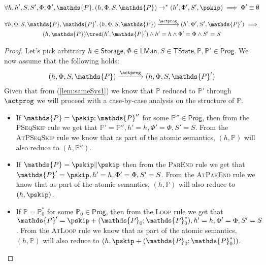 \lem \label{ref:phiemp}
\[
\forall h, h', S, S', \Phi, \Phi', \mathds{P} \ldotp
(h, \Phi, S, \mathds{P}) \rightarrow^* (h', \Phi', S', \pskip) \implies \Phi' \equiv \emptyset
\]

\lem \label{lem:sameSys}
\begin{gather*}
	\forall h, \Phi, S, \mathds{P}, \mathds{P}' \ldotp
	(h, \Phi, S, \mathds{P}) \xrightarrow{\actprog} (h', \Phi', S', \mathds{P}')
		\implies \\
	(h, \mathds{P}) \tred (h', \mathds{P}') \land h' = h \land \Phi' = \Phi \land S' = S
\end{gather*}
\begin{proof}
Let's pick arbitrary $h \in \mathsf{Storage}, \Phi \in \mathsf{LMan}, S \in \mathsf{TState}, \mathds{P}, \mathds{P}' \in \mathsf{Prog}$. We now assume that the following holds:
\begin{gather}
	\label{lem:sameSys1} (h, \Phi, S, \mathds{P}) \xrightarrow{\actprog} (h, \Phi, S, \mathds{P}')
\end{gather}
Given that from (\ref{lem:sameSys1}) we know that $\mathds{P}$ reduced to $\mathds{P'}$ through $\actprog$ we will proceed with a case-by-case analysis on the structure of $\mathds{P}$.
\begin{itemize}
	\item If $\mathds{P} = \pskip ; \mathds{P}''$ for some $\mathds{P}'' \in \mathsf{Prog}$, then from the \textsc{PSeqSkip} rule we get that $\mathds{P}' = \mathds{P}'', h' = h, \Phi' = \Phi, S' = S$. From the \textsc{AtPSeqSkip} rule we know that as part of the atomic semantics, $(h, \mathds{P})$ will also reduce to $(h, \mathds{P}'')$.
	
	\item If $\mathds{P} = \pskip \| \pskip$ then from the \textsc{ParEnd} rule we get that $\mathds{P}' = \pskip, h' = h, \Phi' = \Phi, S' = S$. From the \textsc{AtParEnd} rule we know that as part of the atomic semantics, $(h, \mathds{P})$ will also reduce to $(h, \pskip)$.
	
	\item If $\mathds{P} = \mathds{P}_0^*$ for some $\mathds{P}_0 \in \mathsf{Prog}$, then from the \textsc{Loop} rule we get that $\mathds{P}' = \pskip + (\mathds{P}_0;\mathds{P}_0^*), h' = h, \Phi' = \Phi, S' = S$. From the \textsc{AtLoop} rule we know that as part of the atomic semantics, $(h, \mathds{P})$ will also reduce to $(h, \pskip + (\mathds{P}_0;\mathds{P}_0^*))$.
	

\end{itemize}
\end{proof}
